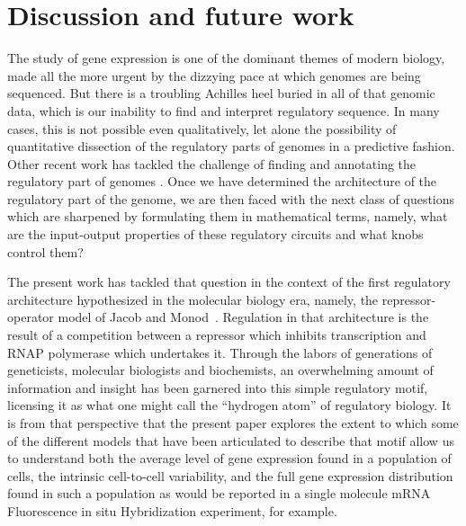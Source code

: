 \section{Discussion and future work}

The study of gene expression is one of the dominant themes of modern biology,
made all the more urgent by the dizzying pace at which genomes are being
sequenced. But there is a troubling Achilles heel buried in all of that genomic
data, which is our inability to find and interpret regulatory sequence. In
many cases, this is not possible even qualitatively, let alone the possibility
of quantitative dissection of the regulatory parts of genomes in a predictive
fashion. Other recent work has tackled the challenge of finding and annotating
the regulatory part of genomes \cite{Belliveau2018, Ireland2020}. Once we have
determined the architecture of the regulatory part of the genome, we are then
faced with the next class of questions which are sharpened by formulating them
in mathematical terms, namely, what are the input-output properties of these
regulatory circuits and what knobs control them?

The present work has tackled that question in the context of the first
regulatory architecture hypothesized in the molecular biology era, namely, the
repressor-operator model of Jacob and Monod~\cite{Jacob1961}. Regulation in that
architecture is the result of a competition between a repressor which inhibits
transcription and RNAP polymerase which undertakes it. Through the labors of
generations of geneticists, molecular biologists and biochemists, an
overwhelming amount of information and insight has been garnered into this
simple regulatory motif, licensing it as what one might call the ``hydrogen
atom'' of regulatory biology. It is from that perspective that the present paper
explores the extent to which some of the different models that have been
articulated to describe that motif allow us to understand both the average level
of gene expression found in a population of cells, the intrinsic cell-to-cell
variability, and the full gene expression distribution found in such a population
as would be reported in a single molecule mRNA Fluorescence in situ
Hybridization experiment, for example.

